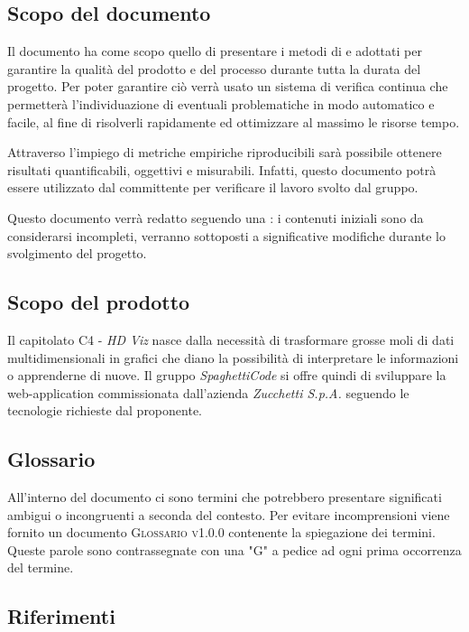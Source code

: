 \documentclass[../piano_di_qualifica.tex]{subfiles}
\begin{document}
\subsection{Scopo del documento}
Il documento ha come scopo quello di presentare i metodi di  e  adottati per garantire la qualità del prodotto e del processo durante tutta la durata del progetto. Per poter garantire ciò verrà usato un sistema di verifica continua che permetterà l'individuazione di eventuali problematiche in modo automatico e facile, al fine di risolverli rapidamente ed ottimizzare al massimo le risorse tempo.

Attraverso l’impiego di metriche empiriche riproducibili sarà possibile ottenere risultati quantificabili, oggettivi e misurabili. Infatti, questo documento potrà essere utilizzato dal committente per verificare il lavoro svolto dal gruppo.

Questo documento verrà redatto seguendo una : i contenuti iniziali sono da considerarsi incompleti, verranno sottoposti a significative modifiche  durante lo svolgimento del progetto.

\subsection{Scopo del prodotto}
Il capitolato C4 - \emph{HD Viz} nasce dalla necessità di trasformare grosse moli di dati multidimensionali in grafici che diano la possibilità di interpretare le informazioni o apprenderne di nuove. Il gruppo \emph{SpaghettiCode} si offre quindi di sviluppare la web-application commissionata dall’azienda \emph{Zucchetti S.p.A.} seguendo le tecnologie richieste dal proponente.

\subsection{Glossario}
All'interno del documento ci sono termini che potrebbero presentare significati ambigui o incongruenti a seconda del contesto. Per evitare incomprensioni viene fornito un documento \textsc{Glossario v1.0.0} contenente la spiegazione dei termini. Queste parole sono contrassegnate con una "G" a pedice ad ogni prima occorrenza del termine.

\subsection{Riferimenti}
\label{sub:riferimenti}
\end{document}
